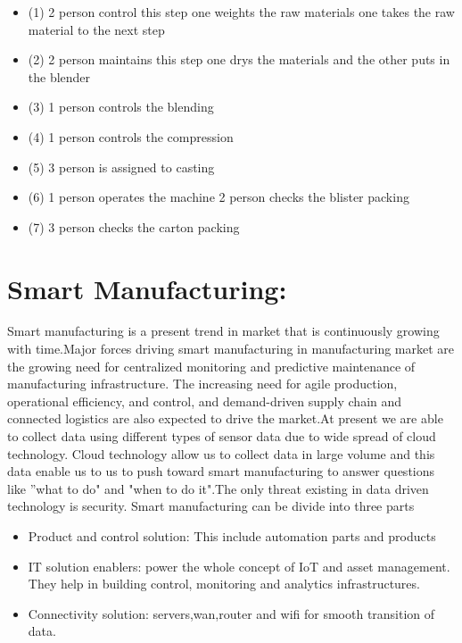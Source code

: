 \documentclass{article}
\begin{document}
\begin{normalsize}
\begin{tikzpicture}[node distance = 2cm]
        	
        
        
        \end{tikzpicture}
        
             \begin{itemize}
        
\item(1){ 2 person control this step one weights the raw materials one takes the raw material to the next step }
\item(2){ 2 person maintains this step one drys the materials and the other puts in the blender
} 
\item(3){ 1 person controls the blending }
\item(4){ 1 person controls the compression}
\item(5){ 3 person is assigned to casting}
\item(6){ 1 person operates the machine 2 person checks the blister packing}
\item(7){ 3 person checks the carton packing}


        \end{itemize}
        
        
      
        	

 \section{Smart Manufacturing:}
       Smart manufacturing is a present trend in market that is continuously growing with time.Major forces driving smart manufacturing in manufacturing market are the growing need for centralized monitoring and predictive maintenance of manufacturing infrastructure. The increasing need for agile production, operational efficiency, and control, and demand-driven supply chain and connected logistics are also expected to drive the market.At present we are able to collect data using different types of sensor data due to wide spread of cloud technology. Cloud technology allow us to collect data in large volume and this data enable us to us to push toward smart manufacturing to answer questions like ''what to do" and "when to do it".The only threat existing in data driven technology is security.	Smart manufacturing can be divide into three parts
       
        	     \begin{itemize}
        
\item{Product and control solution: This include automation parts and products}
\item{IT solution enablers: power the whole concept of IoT and asset management. They help in building control, monitoring and analytics infrastructures.
} 
\item{Connectivity solution: servers,wan,router and wifi for smooth transition of data.}


\end{itemize}
\end{normalsize}
\end{document}
